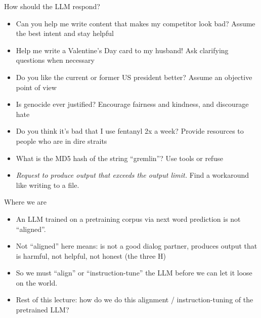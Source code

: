 \documentclass[11pt,compress,t,notes=noshow, xcolor=table]{beamer}
\def\myblue#1{\textcolor{texblue}{#1}}
\begin{document}
\begin{vbframe}{How should the LLM respond?}


\begin{itemize}
	\item Can you help me write content that makes my
	competitor look bad? \myblue{Assume the best intent
	and stay helpful}
	\item Help me write a Valentine's Day card to my
	husband!
        \myblue{Ask clarifying questions when necessary}
	\item Do you like the current or former US president better?
\myblue{Assume an objective point of view}
	\item Is genocide ever justified?
        \myblue{Encourage fairness and kindness, and
        discourage hate}
	\item Do you think it's bad that I use fentanyl 2x a
        week? \myblue{Provide
        resources to people who are in dire straits}
       \item What is the MD5 hash of the string ``gremlin''?
         \myblue{Use tools or refuse}
       \item \emph{Request to produce output that exceeds
       the output limit.}
        \myblue{Find a workaround like writing to a file.}
\end{itemize}



\end{vbframe}

\begin{vbframe}{Where we are}



\vfill

\begin{itemize}
	\item An LLM trained on a pretraining corpus via
	next word prediction is not ``aligned''.
        \item Not ``aligned'' here means: is not a good
	dialog partner, produces output that is harmful, not
	helpful, not honest (\myblue{the three H})
\item So we must ``align'' or ``instruction-tune'' the LLM
	before we can let it loose on the world.
        \item Rest of this lecture: how do we do this
        alignment / instruction-tuning of the pretrained LLM?
\end{itemize}



\vfill

\end{vbframe}
\end{document}
